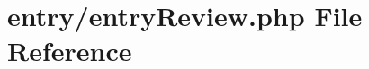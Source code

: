 \hypertarget{entry_review_8php}{}\section{entry/entry\+Review.php File Reference}
\label{entry_review_8php}
